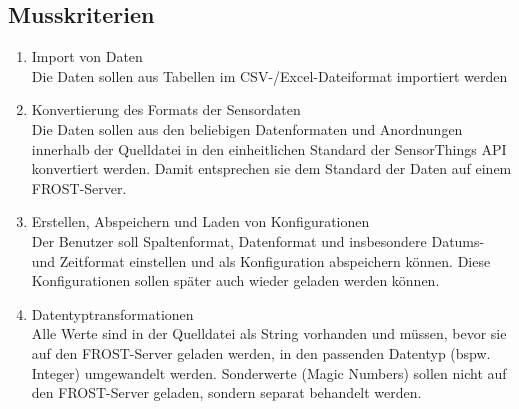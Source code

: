 \documentclass[a4paper, 12 pt]{article}
\begin{document}
	\subsection{Musskriterien}
	\begin{enumerate}
	\item Import von Daten \\
	Die Daten sollen aus Tabellen im CSV-/Excel-Dateiformat importiert werden
	\item Konvertierung des Formats der Sensordaten \\
	Die Daten sollen aus den beliebigen Datenformaten und Anordnungen innerhalb der Quelldatei in den einheitlichen Standard der SensorThings API konvertiert werden.
	Damit entsprechen sie dem Standard der Daten auf einem FROST-Server.
	\item Erstellen, Abspeichern und Laden von Konfigurationen \\
	Der Benutzer soll Spaltenformat, Datenformat und insbesondere Datums- und Zeitformat einstellen und als Konfiguration abspeichern können.
	Diese Konfigurationen sollen später auch wieder geladen werden können.
	\item Datentyptransformationen \\
	Alle Werte sind in der Quelldatei als String vorhanden und müssen, bevor sie auf den FROST-Server geladen werden, in den passenden Datentyp (bspw. Integer) umgewandelt werden.
	Sonderwerte (Magic Numbers) sollen nicht auf den FROST-Server geladen, sondern separat behandelt werden.
	\end{enumerate}
\end{document}
